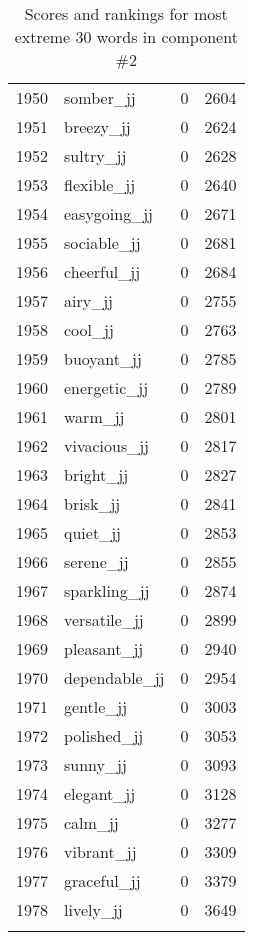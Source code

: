 \begin{longtable}[!htbp]{| rlr@{.}l |}
    1950 & somber\_jj & 0 & 2604 \\
    1951 & breezy\_jj & 0 & 2624 \\
    1952 & sultry\_jj & 0 & 2628 \\
    1953 & flexible\_jj & 0 & 2640 \\
    1954 & easygoing\_jj & 0 & 2671 \\
    1955 & sociable\_jj & 0 & 2681 \\
    1956 & cheerful\_jj & 0 & 2684 \\
    1957 & airy\_jj & 0 & 2755 \\
    1958 & cool\_jj & 0 & 2763 \\
    1959 & buoyant\_jj & 0 & 2785 \\
    1960 & energetic\_jj & 0 & 2789 \\
    1961 & warm\_jj & 0 & 2801 \\
    1962 & vivacious\_jj & 0 & 2817 \\
    1963 & bright\_jj & 0 & 2827 \\
    1964 & brisk\_jj & 0 & 2841 \\
    1965 & quiet\_jj & 0 & 2853 \\
    1966 & serene\_jj & 0 & 2855 \\
    1967 & sparkling\_jj & 0 & 2874 \\
    1968 & versatile\_jj & 0 & 2899 \\
    1969 & pleasant\_jj & 0 & 2940 \\
    1970 & dependable\_jj & 0 & 2954 \\
    1971 & gentle\_jj & 0 & 3003 \\
    1972 & polished\_jj & 0 & 3053 \\
    1973 & sunny\_jj & 0 & 3093 \\
    1974 & elegant\_jj & 0 & 3128 \\
    1975 & calm\_jj & 0 & 3277 \\
    1976 & vibrant\_jj & 0 & 3309 \\
    1977 & graceful\_jj & 0 & 3379 \\
    1978 & lively\_jj & 0 & 3649 \\
    \hline
    \caption{Scores and rankings for most extreme 30 words in component \#2} \\
\end{longtable}
